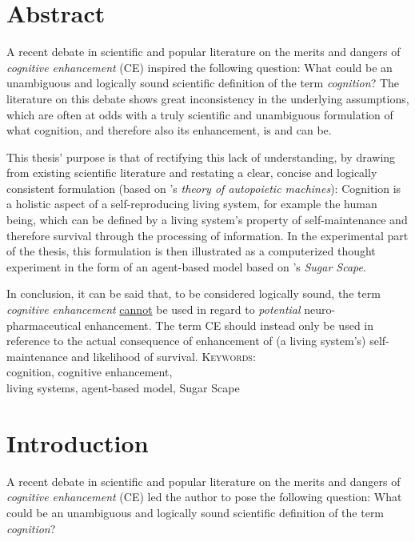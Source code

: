 \chapter*{Abstract}
{\large A recent debate in scientific and popular literature on the merits and dangers of \emph{cognitive enhancement} (CE) inspired the following question: What could be an unambiguous and logically sound scientific definition of the term \emph{cognition}? The literature on this debate shows great inconsistency in the underlying assumptions, which are often at odds with a truly scientific and unambiguous formulation of what cognition, and therefore also its enhancement, is and can be. 

This thesis' purpose is that of rectifying this lack of understanding, by drawing from existing scientific literature and restating a clear, concise and logically consistent formulation (based on \citeauthor{Maturana1980}’s \citeyearpar{Maturana1980} \emph{theory of autopoietic machines}): Cognition is a holistic aspect of a self-reproducing living system, for example the human being, which can be defined by a living system's property of self-maintenance and therefore survival through the processing of information. In the experimental part of the thesis, this formulation is then illustrated as a computerized thought experiment in the form of an agent-based model based on \citeauthor{Epstein1996}’s \citeyearpar{Epstein1996} \emph{Sugar Scape}.

In conclusion, it can be said that, to be considered logically sound, the term \emph{cognitive enhancement} \underline{cannot} be used in regard to \emph{potential} neuro-pharmaceutical enhancement. The term CE should instead only be used in reference to the actual consequence of enhancement of (a living system's) self-maintenance and likelihood of survival.
\vfill
\textsc{Keywords:}\\[4mm]
cognition, cognitive enhancement,\\ living systems, agent-based model, Sugar Scape
\vfill
}
\tableofcontents
{}

\mainmatter

\chapter{Introduction}
A recent debate in scientific and popular literature on the merits and dangers of \emph{cognitive enhancement} (CE) led the author to pose the following question: What could be an unambiguous and logically sound scientific definition of the term \emph{cognition}?

